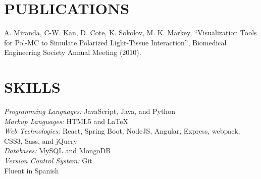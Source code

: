 \documentclass[line,margin,letterpaper]{res}
\begin{document}
\begin{resume}
 
\section{PUBLICATIONS} 
  A. Miranda, C-W. Kan, D. Cote, K. Sokolov, M. K. Markey, ``Visualization
  Tools for Pol-MC to Simulate Polarized Light-Tissue Interaction'',
  Biomedical Engineering Society Annual Meeting (2010).

\section{SKILLS}
  \emph{Programming Languages:} JavaScript, Java, and Python\\
  \emph{Markup Languages:} HTML5 and \LaTeX \\
  \emph{Web Technologies:} React, Spring Boot, NodeJS, Angular, Express,
  webpack, CSS3, Sass, and jQuery \\
  \emph{Databases:} MySQL and MongoDB \\
  \emph{Version Control System:} Git \\
  Fluent in Spanish

\end{resume}
\end{document}
